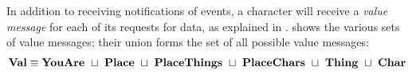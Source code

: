 In addition to receiving notifications of events, a character will
receive a {\em value message} for each of its requests for
data, as explained in .
 shows the various sets of value messages;
their union forms the set of all possible value messages:
\begin{align}
  \textbf{Val} \equiv \textbf{YouAre}
  ~\sqcup~ \textbf{Place}
  ~\sqcup~ \textbf{PlaceThings}
  ~\sqcup~ \textbf{PlaceChars}
  ~\sqcup~ \textbf{Thing}
  ~\sqcup~ \textbf{Char}
\end{align}

